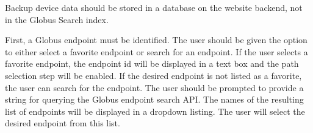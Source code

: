 Backup device data should be stored in a database on the website backend, not in
the Globus Search index.

First, a Globus endpoint must be identified. The user should be given the option
to either select a favorite endpoint or search for an endpoint. If the user
selects a favorite endpoint, the endpoint id will be displayed in a text box
and the path selection step will be enabled. If the desired endpoint is not
listed as a favorite, the user can search for the endpoint.
The user should be prompted to provide
a string for querying the Globus endpoint search API. The names of the resulting 
list of endpoints will be displayed in a dropdown listing. The user will select
the desired endpoint from this list.

